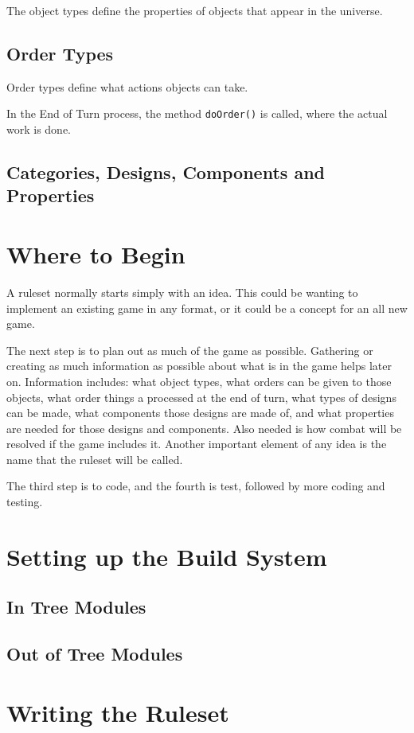 \documentclass[a4paper,11pt]{report}
\begin{document}
The object types define the properties of objects that appear in the universe.

\section{Order Types}
\label{sec:order-types}

Order types define what actions objects can take.

In the End of Turn process, the method \texttt{doOrder()} is called, where the actual work is done.

\section{Categories, Designs, Components and Properties}
\label{sec:designs-components-properties}

\chapter{Where to Begin}
\label{chap:begin}

A ruleset normally starts simply with an idea. This could be wanting to implement an existing game in any format, or it could be a concept for an all new game.

The next step is to plan out as much of the game as possible. Gathering or creating as much information as possible about what is in the game helps later on. Information includes: what object types, what orders can be given to those objects, what order things a processed at the end of turn, what types of designs can be made, what components those designs are made of, and what properties are needed for those designs and components.  Also needed is how combat will be resolved if the game includes it.
Another important element of any idea is the name that the ruleset will be called.


The third step is to code, and the fourth is test, followed by more coding and testing.


\chapter{Setting up the Build System}
\label{chap:build-system}


\section{In Tree Modules}
\label{sec:intree-module-build}


\section{Out of Tree Modules}
\label{sec:outoftree-module-build}



\chapter{Writing the Ruleset}
\label{chap:ruleset-writing}
\end{document}
